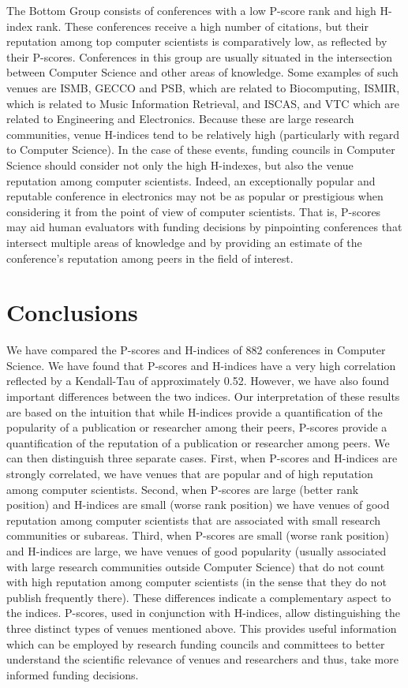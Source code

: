 \documentclass[notitlepage]{svjour3}
\begin{document}
The Bottom Group consists of conferences with a low P-score rank and high H-index rank. These conferences
receive a high number of citations, but their reputation among top computer scientists is comparatively low, as reflected by their P-scores. Conferences in this
group are usually situated in the intersection between Computer Science and other areas of knowledge. Some examples of such venues are
ISMB, GECCO and PSB, which are related to Biocomputing, ISMIR, which is related to Music Information Retrieval, and
ISCAS, and VTC which are related to Engineering and Electronics. Because these are large research communities, venue H-indices tend to be 
relatively high (particularly with regard to Computer Science). In the case of these events, funding councils in Computer Science should consider not only the high H-indexes, but also the venue reputation among computer
scientists. Indeed, an exceptionally popular and reputable conference in electronics may not be as 
popular or prestigious when considering it from the point of view of computer scientists. That is, P-scores may aid 
human evaluators with funding decisions by pinpointing conferences that intersect multiple areas of knowledge and by providing
an estimate of the conference's reputation among peers in the field of interest.


\section{Conclusions}
\label{sec:conclusions}

We have compared the P-scores and H-indices of 882 conferences in Computer Science. 
We have found that P-scores and H-indices have a very high correlation reflected by a Kendall-Tau of 
approximately 0.52. However,
we have also found important differences between the two indices.
Our interpretation of these results are based on the intuition that while H-indices provide a quantification of the popularity of a publication or researcher among their peers, P-scores provide a quantification of the reputation of a publication or researcher among peers. We can then distinguish three separate cases. First, when P-scores and H-indices are strongly correlated, we have venues that are popular and of high reputation among computer scientists. Second, when P-scores are large (better rank position) and H-indices are small (worse rank position) we have venues of good reputation among computer scientists that are associated with small research communities or subareas. Third, when P-scores are small (worse rank position) and H-indices are large, we have venues of good popularity (usually associated with large research communities outside Computer Science) that do not count with high reputation among computer scientists (in the sense that they do not publish frequently there).
These differences indicate a complementary aspect to the indices. P-scores, used in conjunction with H-indices, allow distinguishing the three distinct types of venues mentioned above. This provides useful information which
can be employed
by research funding councils and committees to better understand 
the scientific relevance of venues and researchers and thus, take more informed funding decisions.
\end{document}
